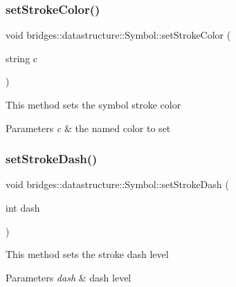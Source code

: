 \subsubsection{\texorpdfstring{set\+Stroke\+Color()}{setStrokeColor()}\hspace{0.1cm}{\footnotesize\ttfamily [2/2]}}
{\footnotesize\ttfamily void bridges\+::datastructure\+::\+Symbol\+::set\+Stroke\+Color (\begin{DoxyParamCaption}\item[{string}]{c }\end{DoxyParamCaption})\hspace{0.3cm}{\ttfamily [inline]}}

This method sets the symbol stroke color


\begin{DoxyParams}{Parameters}
{\em c} & the named color to set \\
\hline
\end{DoxyParams}
\mbox{\label{classbridges_1_1datastructure_1_1_symbol_afd39d3b65d22bc2a1be64c8728f5e5d7}} 
\subsubsection{\texorpdfstring{set\+Stroke\+Dash()}{setStrokeDash()}}
{\footnotesize\ttfamily void bridges\+::datastructure\+::\+Symbol\+::set\+Stroke\+Dash (\begin{DoxyParamCaption}\item[{int}]{dash }\end{DoxyParamCaption})\hspace{0.3cm}{\ttfamily [inline]}}

This method sets the stroke dash level


\begin{DoxyParams}{Parameters}
{\em dash} & dash level \\
\hline
\end{DoxyParams}
\mbox{\label{classbridges_1_1datastructure_1_1_symbol_a56238a4535a26bc3eea698eea4b65921}} 
